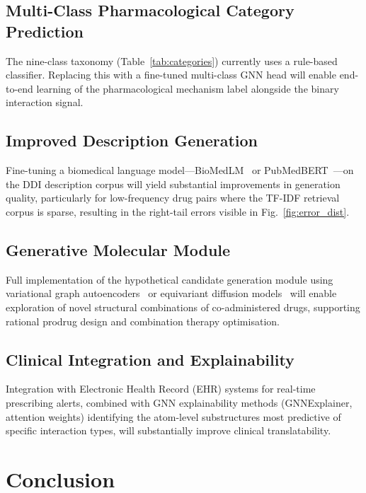 \documentclass[conference]{IEEEtran}
\begin{document}
\subsection{Multi-Class Pharmacological Category Prediction}

The nine-class taxonomy (Table~\ref{tab:categories}) currently uses a rule-based classifier.
Replacing this with a fine-tuned multi-class GNN head will enable end-to-end learning of
the pharmacological mechanism label alongside the binary interaction signal.

\subsection{Improved Description Generation}

Fine-tuning a biomedical language model---BioMedLM~\cite{bolton2022biomedlm} or
PubMedBERT~\cite{gu2021pubmedbert}---on the DDI description corpus will yield substantial
improvements in generation quality, particularly for low-frequency drug pairs where the
TF-IDF retrieval corpus is sparse, resulting in the right-tail errors visible in
Fig.~\ref{fig:error_dist}.

\subsection{Generative Molecular Module}

Full implementation of the hypothetical candidate generation module using variational graph
autoencoders~\cite{decao2018molgan} or equivariant diffusion models~\cite{hoogeboom2022edm}
will enable exploration of novel structural combinations of co-administered drugs, supporting
rational prodrug design and combination therapy optimisation.

\subsection{Clinical Integration and Explainability}

Integration with Electronic Health Record (EHR) systems for real-time prescribing alerts,
combined with GNN explainability methods (GNNExplainer, attention weights) identifying the
atom-level substructures most predictive of specific interaction types, will substantially
improve clinical translatability.

\section{Conclusion}
\label{sec:conclusion}
\end{document}
